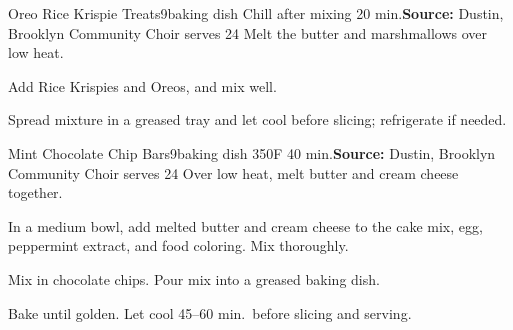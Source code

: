 




\begin{recipe}{Oreo Rice Krispie Treats}{9\inch{}\inch baking dish \hfill Chill after mixing \hfill 20 min.}{\textbf{Source:}  Dustin, Brooklyn Community Choir \hfill serves 24}
 Melt the butter and marshmallows over low heat.

 Add Rice Krispies and Oreos, and mix well.

 \newstep Spread mixture in a greased tray and let cool before slicing; refrigerate if needed.
\end{recipe}

\begin{recipe}{Mint Chocolate Chip Bars}{9\inch{}\inch baking dish \hfill 350\0F \hfill 40 min.}{\textbf{Source:} Dustin, Brooklyn Community Choir \hfill serves 24}
 Over low heat, melt butter and cream cheese together.

 In a medium bowl, add melted butter and cream cheese to the cake mix, egg, peppermint extract, and food coloring. Mix thoroughly.

 Mix in chocolate chips. Pour mix into a greased baking dish.

 \newstep Bake until golden. Let cool 45--60 min.\ before slicing and serving.
\end{recipe}
